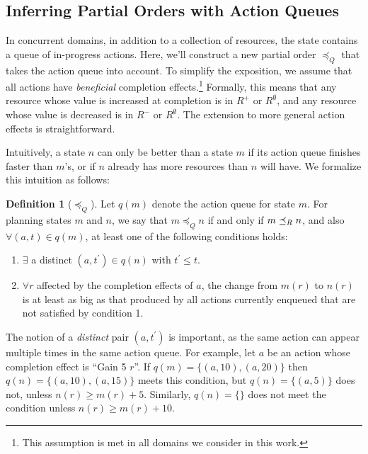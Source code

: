 \documentclass[letterpaper]{article}
\theoremstyle{plain} \newtheorem{theorem}{Theorem} \newtheorem{proposition}{Proposition} \newtheorem{lemma}{Lemma}
\theoremstyle{definition} \newtheorem{definition}{Definition} \newtheorem{conjecture}{Conjecture} \newtheorem*{example}{Example}
\theoremstyle{remark} \newtheorem*{remark}{Remark} \newtheorem*{note}{Note} \newtheorem{case}{Case}
\begin{document}
\subsection{Inferring Partial Orders with Action Queues}

\newcommand{\poq}{\preceq_Q}

In concurrent domains, in addition to a collection of resources, the state contains a queue
of in-progress actions. Here, we'll construct a new partial order $\poq$ that takes the
action queue into account. To simplify the exposition, we assume that all
actions have \emph{beneficial} completion effects.\footnote{This assumption is met in all
domains we consider in this work.} Formally, this means that any resource whose value is
increased at completion is in $R^+$ or $R^\emptyset$, and any resource whose value is decreased is in
$R^-$ or $R^\emptyset$. The extension to more general action effects is straightforward.

Intuitively, a state $n$ can only be better than a state $m$ if
its action queue finishes faster than $m$'s, or if $n$ already
has more resources than $n$ will have. We formalize this
intuition as follows:

\begin{definition}[$\poq$]
	\label{def-poq}
	Let $q(m)$ denote the action queue for state $m$. For
  planning states $m$ and $n$, we say that $m \poq n$ if and
  only if $m \preceq_R n$, and also $\forall (a, t) \in q(m)$, at least one of the following conditions holds:
	\begin{enumerate}
		\item $\exists$ a distinct $ (a, t^\prime) \in q(n)$ with $t^\prime \le t$.
		\item $\forall r $ affected by the completion effects of $
      a$, the change from $m(r)$ to $n(r)$ is at least as big
      as that produced by all actions currently enqueued that
      are not satisfied by condition 1.
	\end{enumerate}
\end{definition}
The notion of a \emph{distinct} pair $(a, t^\prime)$ is important, as the same action can appear multiple times in the same action queue. For example, let $a$ be an action whose completion effect is ``Gain 5 $r$''. If $q(m) = \{(a, 10), (a, 20)\}$ then $q(n) = \{(a, 10),
(a, 15)\}$ meets this condition, but $q(n) = \{(a, 5)\}$ does not, unless $n(r) \ge m(r) + 5$. Similarly, $q(n) = \{\}$ does not meet the condition unless $n(r) \ge m(r) + 10$.
\end{document}
